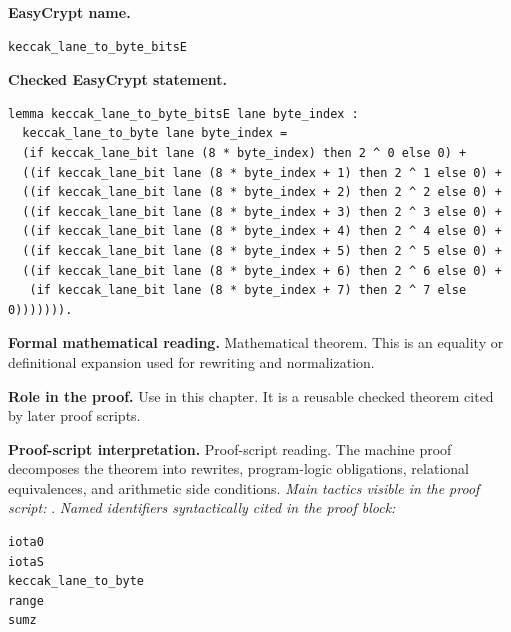 \begin{formaltheorem}
\noindent\textbf{EasyCrypt name.}
\begin{lstlisting}[language=EasyCrypt,basicstyle=\ttfamily\scriptsize]
keccak_lane_to_byte_bitsE
\end{lstlisting}
\noindent\textbf{Checked EasyCrypt statement.}
\begin{lstlisting}[language=EasyCrypt,basicstyle=\ttfamily\scriptsize]
lemma keccak_lane_to_byte_bitsE lane byte_index :
  keccak_lane_to_byte lane byte_index =
  (if keccak_lane_bit lane (8 * byte_index) then 2 ^ 0 else 0) +
  ((if keccak_lane_bit lane (8 * byte_index + 1) then 2 ^ 1 else 0) +
  ((if keccak_lane_bit lane (8 * byte_index + 2) then 2 ^ 2 else 0) +
  ((if keccak_lane_bit lane (8 * byte_index + 3) then 2 ^ 3 else 0) +
  ((if keccak_lane_bit lane (8 * byte_index + 4) then 2 ^ 4 else 0) +
  ((if keccak_lane_bit lane (8 * byte_index + 5) then 2 ^ 5 else 0) +
  ((if keccak_lane_bit lane (8 * byte_index + 6) then 2 ^ 6 else 0) +
   (if keccak_lane_bit lane (8 * byte_index + 7) then 2 ^ 7 else 0))))))).
\end{lstlisting}
\noindent\textbf{Formal mathematical reading.}
Mathematical theorem. This is an equality or definitional expansion used for rewriting and normalization.

\noindent\textbf{Role in the proof.}
Use in this chapter. It is a reusable checked theorem cited by later proof scripts.

\noindent\textbf{Proof-script interpretation.}
Proof-script reading. The machine proof decomposes the theorem into rewrites, program-logic obligations, relational equivalences, and arithmetic side conditions.
\emph{Main tactics visible in the proof script:} .
\emph{Named identifiers syntactically cited in the proof block:}
\begin{lstlisting}[language=EasyCrypt,basicstyle=\ttfamily\scriptsize]
iota0
iotaS
keccak_lane_to_byte
range
sumz
\end{lstlisting}

\end{formaltheorem}

